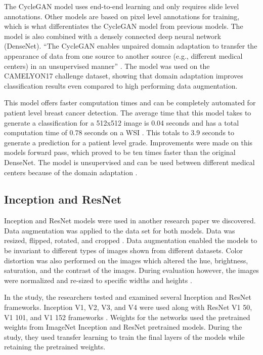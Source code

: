 \documentclass[11pt]{ieeeconf}
\begin{document}
The CycleGAN model uses end-to-end learning and only requires slide level annotations. Other models are based on pixel level annotations for training, which is what differentiates the CycleGAN model from previous models. The model is also combined with a densely connected deep neural network (DenseNet). “The CycleGAN enables unpaired domain adaptation to transfer the appearance of data from one source to another source (e.g., different medical centers) in an unsupervised manner” \cite{wollmann}. The model was used on the CAMELYON17 challenge dataset, showing that domain adaptation improves classification results even compared to high performing data augmentation.

This model offers faster computation times and can be completely automated for patient level breast cancer detection. The average time that this model takes to generate a classification for a 512x512 image is 0.04 seconds and has a total computation time of 0.78 seconds on a WSI \cite{wollmann}. This totals to 3.9 seconds to generate a prediction for a patient level grade. Improvements were made on this models forward pass, which proved to be ten times faster than the original DenseNet. The model is unsupervised and can be used between different medical centers because of the domain adaptation \cite{wollmann}.

\subsection{Inception and ResNet}
Inception and ResNet models were used in another research paper we discovered. Data augmentation was applied to the data set for both models. Data was resized, flipped, rotated, and cropped \cite{hamidreza}. Data augmentation enabled the models to be invariant to different types of images shown from different datasets. Color distortion was also performed on the images which altered the hue, brightness, saturation, and the contrast of the images. During evaluation however, the images were normalized and re-sized to specific widths and heights \cite{hamidreza}.

In the study, the researchers tested and examined several Inception and ResNet frameworks. Inception V1, V2, V3, and V4 were used along with ResNet V1 50, V1 101, and V1 152 frameworks \cite{hamidreza}. Weights for the networks used the pretrained weights from ImageNet Inception and ResNet pretrained models. During the study, they used transfer learning to train the final layers of the models while retaining the pretrained weights.
\end{document}

